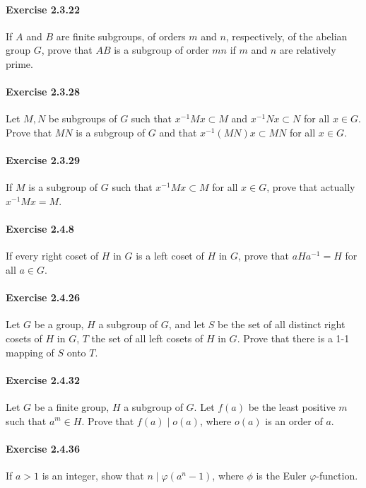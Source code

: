 \documentclass{article}
\begin{document}
\paragraph{Exercise 2.3.22} If $A$ and $B$ are finite subgroups, of orders $m$ and $n$, respectively, of the abelian group $G$, prove that $AB$ is a subgroup of order $mn$ if $m$ and $n$ are relatively prime.

\paragraph{Exercise 2.3.28} Let $M, N$ be subgroups of $G$ such that $x^{-1}Mx \subset M$ and $x^{-1} N x \subset N$ for all $x \in G$. Prove that $MN$ is a subgroup of $G$ and that $x^{-1} (MN)x \subset MN$ for all $x \in G$.

\paragraph{Exercise 2.3.29} If $M$ is a subgroup of $G$ such that $x^{-1}Mx \subset M$ for all $x \in G$, prove that actually $x^{-1}Mx = M$.

\paragraph{Exercise 2.4.8} If every right coset of $H$ in $G$ is a left coset of $H$ in $G$, prove that $aHa^{-1} = H$ for all $a \in G$.

\paragraph{Exercise 2.4.26} Let $G$ be a group, $H$ a subgroup of $G$, and let $S$ be the set of all distinct right cosets of $H$ in $G$, $T$ the set of all left cosets of $H$ in $G$. Prove that there is a 1-1 mapping of $S$ onto $T$.

\paragraph{Exercise 2.4.32} Let $G$ be a finite group, $H$ a subgroup of $G$. Let $f(a)$ be the least positive $m$ such that $a^m \in H$. Prove that $f(a) \mid o(a)$, where $o(a)$ is an order of $a$.

\paragraph{Exercise 2.4.36} If $a > 1$ is an integer, show that $n \mid \varphi(a^n - 1)$, where $\phi$ is the Euler $\varphi$-function.
\end{document}
